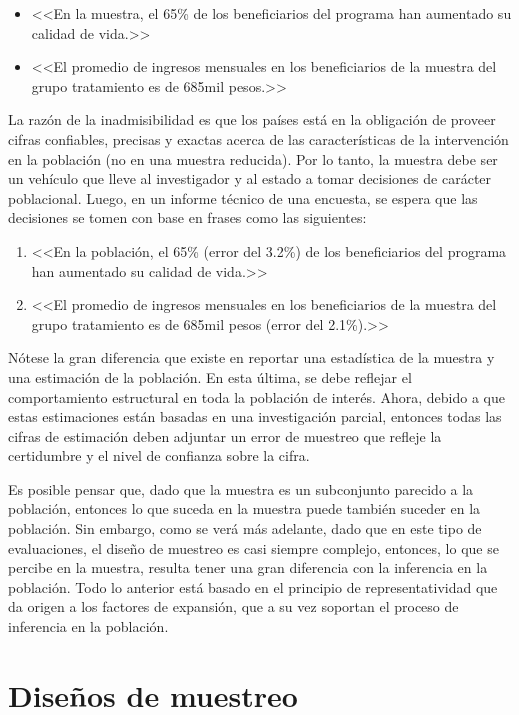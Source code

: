 \documentclass[
  12pt,
  spanish,
]{book}
\begin{document}
\begin{itemize}
\item <<En la muestra, el 65\% de los beneficiarios del programa han aumentado su calidad de vida.>>
\item  <<El promedio de ingresos mensuales en los beneficiarios de la muestra del grupo tratamiento es de 685mil pesos.>>
\end{itemize}

La razón de la inadmisibilidad es que los países está en la obligación de proveer cifras confiables, precisas y exactas acerca de las características de la intervención en la población (no en una muestra reducida). Por lo tanto, la muestra debe ser un vehículo que lleve al investigador y al estado a tomar decisiones de carácter poblacional. Luego, en un informe técnico de una encuesta, se espera que las decisiones se tomen con base en frases como las siguientes:

\begin{enumerate}
\item   <<En la población, el 65\% (error del 3.2\%) de los beneficiarios del programa han aumentado su calidad de vida.>>
\item   <<El promedio de ingresos mensuales en los beneficiarios de la muestra del grupo tratamiento es de 685mil pesos (error del 2.1\%).>>
\end{enumerate}

Nótese la gran diferencia que existe en reportar una estadística de la muestra y una estimación de la población. En esta última, se debe reflejar el comportamiento estructural en toda la población de interés. Ahora, debido a que estas estimaciones están basadas en una investigación parcial, entonces todas las cifras de estimación deben adjuntar un error de muestreo que refleje la certidumbre y el nivel de confianza sobre la cifra.

Es posible pensar que, dado que la muestra es un subconjunto parecido a la población, entonces lo que suceda en la muestra puede también suceder en la población. Sin embargo, como se verá más adelante, dado que en este tipo de evaluaciones, el diseño de muestreo es casi siempre complejo, entonces, lo que se percibe en la muestra, resulta tener una gran diferencia con la inferencia en la población. Todo lo anterior está basado en el principio de representatividad que da origen a los factores de expansión, que a su vez soportan el proceso de inferencia en la población.

\hypertarget{diseuxf1os-de-muestreo}{%
\section{Diseños de muestreo}\label{diseuxf1os-de-muestreo}}
\end{document}
